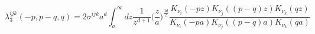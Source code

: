 \begin{equation}
\lambda_3^{ijk}(-p,p-q,q)=2 \sigma^{ijk} a^d \int_a^\infty dz \frac
{1} {z^{d+1}}\Big(\frac {z} {a} \Big)^{\frac {3d} {2}} \frac
{K_{\nu_i}(-pz)K_{\nu_j}((p-q)z)K_{\nu_k}(q z)}
{K_{\nu_i}(-pa)K_{\nu_j}((p-q)a)K_{\nu_k}(q a)}
\label{fp3}
\end{equation}

